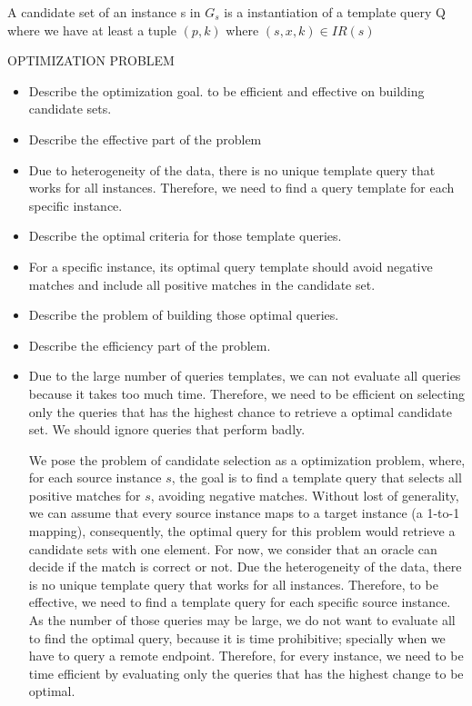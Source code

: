 \begin{definition}   A candidate set of an instance s in $G_s$ is a instantiation of a template query Q where we have at least a tuple $(p,k)$ where $(s,x,k) \in IR(s)$
\end{definition} 


OPTIMIZATION PROBLEM
\begin{itemize}
\item Describe the optimization goal. to be efficient and effective on building candidate sets.
\item Describe the effective part of the problem
\item Due to heterogeneity of the data, there is no unique template query that works for all instances. Therefore, we need to find a query template for each specific instance. 
\item Describe the optimal criteria for those template queries. 
\item For a specific instance, its optimal query template should avoid negative matches and include all positive matches in the candidate set. 
\item Describe the problem of building those optimal queries.
\item Describe the efficiency part of the problem. 
\item Due to the large number of queries templates, we can not evaluate all queries because it takes too much time. Therefore, we need to be efficient on selecting only the queries that has the highest chance to retrieve a optimal candidate set. We should ignore queries that perform badly.

We pose the problem of candidate selection as a optimization problem, where, for each source instance $s$, the goal is to find a template query that selects all positive matches for $s$, avoiding negative matches. Without lost of generality, we can assume that every source instance maps to a target instance (a 1-to-1 mapping), consequently, the optimal query for this problem would retrieve a candidate sets with one element. For now, we consider that an oracle can decide if the match is correct or not. Due the heterogeneity of the data, there is no unique template query that works for all instances. Therefore, to be effective, we need to find a template query for each specific source instance.  As the number of those queries may be large, we do not want to evaluate all to find the optimal query, because it is time prohibitive; specially when we have to query a remote endpoint. Therefore, for every instance, we need to be time efficient by evaluating only the queries that has the highest change to be optimal.
\end{itemize}




